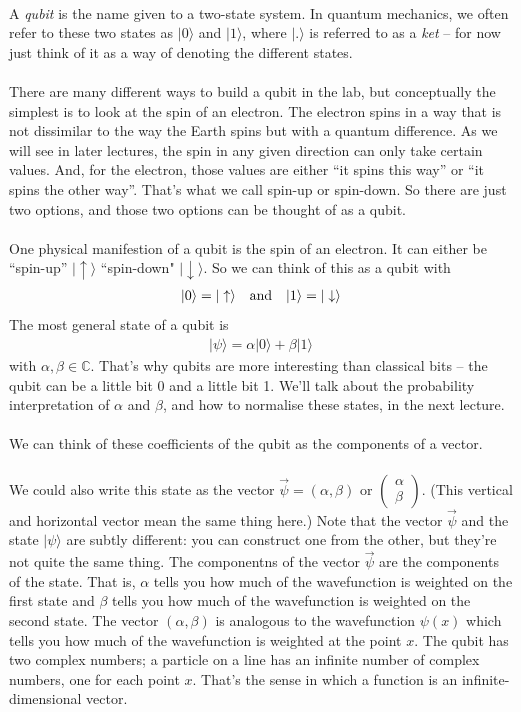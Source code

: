 \documentclass[12pt]{article}
\def\be{\begin{eqnarray}}
\def\ee{\end{eqnarray}}
\newcommand{\nn}{\nonumber}
\newcommand\para{\paragraph{}}
\newcommand{\ket}[1]{|#1\rangle}
\newcommand{\co}{\color{olive}}
\newcommand{\C}{{\mathds C}}
\begin{document}
\para
{\co A {\it qubit} is the name given to a two-state system. In quantum mechanics, we often refer to these two states as $\ket{0}$ and $\ket{1}$, where $\ket{.}$ is referred to as a {\it ket} -- for now just think of it as a way of denoting the different states.}

\para
There are many different ways to build a qubit in the lab, but conceptually the simplest is to look at the spin of an electron. The electron spins in a way that is not dissimilar to the way the Earth spins but with a quantum difference. As we will see in later lectures, the spin in any given direction can only take certain values. And, for the electron, those values are either ``it spins this way'' or ``it spins the other way''. That's what we call spin-up or spin-down. So there are just two options, and those two options can be thought of as a qubit. 

\para
{\co One physical manifestion of a qubit is the spin of an electron. It can either be ``spin-up'' $\ket{\uparrow}$ ``spin-down" $\ket{\downarrow}$. So we can think of this as a qubit with
%
\be \ket{0} = \ket{\uparrow}\ \ \ {\rm and}\ \ \ \ket{1} = \ket{\downarrow}\nn\ee
%
The most general state of a qubit is 
%
\be \ket{\psi} = \alpha \ket{0} + \beta\ket{1}\nn\ee
%
with $\alpha,\beta\in \C$.} That's why qubits are more interesting than classical bits -- the qubit can be a little bit 0 and a little bit 1. We'll talk about the probability interpretation of $\alpha$ and $\beta$, and how to normalise these states, in the next lecture. 

\para
We can think of these coefficients of the qubit as the components of a vector.

\para
{\co We could also write this state as the vector $\vec{\psi}= (\alpha,\beta)$ or $\left(\begin{smallmatrix} \alpha\\ \beta \end{smallmatrix}\right)$.}  (This vertical and horizontal vector mean the same thing here.) Note that the vector $\vec{\psi}$ and the state $\ket{\psi}$ are subtly different: you can construct one from the other, but they're not quite the same thing. The componentns of the vector $\vec{\psi}$ are  the components of the state. That is, $\alpha$ tells you how much of the wavefunction is weighted on the first state and $\beta$  tells you how much of the wavefunction is weighted on  the second state. {\co The vector $(\alpha,\beta)$  is analogous to the wavefunction $\psi(x)$ which tells you how much of the wavefunction is weighted at the point $x$.} The qubit has two complex numbers; a particle on a line has an infinite number of complex numbers, one for each point $x$. That's the sense in which a function is an infinite-dimensional vector. 
\end{document}
